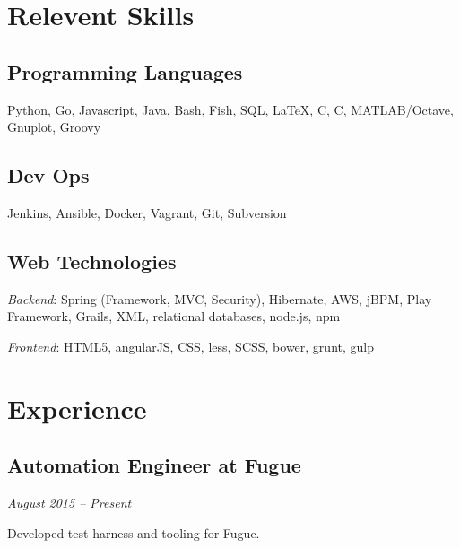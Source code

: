 \documentclass[a4paper,11pt]{article}
\newcommand{\CC}{C\nolinebreak\hspace{-.05em}\raisebox{.4ex}{\tiny\bf
    +}\nolinebreak\hspace{-.10em}\raisebox{.4ex}{\tiny\bf +}}
\def\CC{{C\nolinebreak[4]\hspace{-.05em}\raisebox{.4ex}{\tiny\bf ++}}}
\begin{document}

  \section*{Relevent Skills}

  \begin{multicols}{2}
    \raggedright

    \subsection*{Programming Languages}

    Python, Go, Javascript, Java, Bash, Fish, SQL, \LaTeX, C, \CC, MATLAB/Octave, Gnuplot, Groovy

    \subsection*{Dev Ops}

    Jenkins, Ansible, Docker, Vagrant, Git, Subversion
    \vfill
    \columnbreak

    \subsection*{Web Technologies}

    \textsl{Backend}: Spring (Framework, MVC, Security), Hibernate, AWS, jBPM, Play Framework,
    Grails, XML, relational databases, node.js, npm

    \textsl{Frontend}: HTML5, angularJS, CSS, less, SCSS, bower, grunt, gulp


  \end{multicols}


\vspace{-9pt}
\section*{Experience}

\subsection*{Automation Engineer at Fugue}
\vskip -20pt
\hfill \textit{August 2015 -- Present}

Developed test harness and tooling for Fugue.
\end{document}
